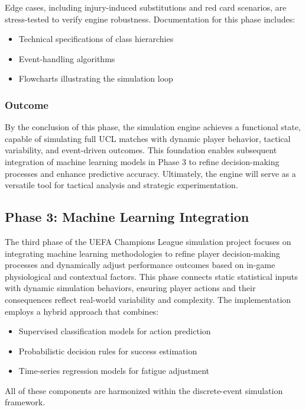 \documentclass[12pt]{article}
\begin{document}
Edge cases, including injury-induced substitutions and red card scenarios, are stress-tested to verify engine robustness. Documentation for this phase includes:
\begin{itemize}
    \item Technical specifications of class hierarchies
    \item Event-handling algorithms
    \item Flowcharts illustrating the simulation loop
\end{itemize}

\subsubsection{Outcome}
By the conclusion of this phase, the simulation engine achieves a functional state, capable of simulating full UCL matches with dynamic player behavior, tactical variability, and event-driven outcomes. This foundation enables subsequent integration of machine learning models in Phase 3 to refine decision-making processes and enhance predictive accuracy. Ultimately, the engine will serve as a versatile tool for tactical analysis and strategic experimentation.

\subsection{Phase 3: Machine Learning Integration}
The third phase of the UEFA Champions League simulation project focuses on integrating machine learning methodologies to refine player decision-making processes and dynamically adjust performance outcomes based on in-game physiological and contextual factors. This phase connects static statistical inputs with dynamic simulation behaviors, ensuring player actions and their consequences reflect real-world variability and complexity. The implementation employs a hybrid approach that combines:

\begin{itemize}
    \item Supervised classification models for action prediction
    \item Probabilistic decision rules for success estimation
    \item Time-series regression models for fatigue adjustment
\end{itemize}

All of these components are harmonized within the discrete-event simulation framework.
\end{document}
